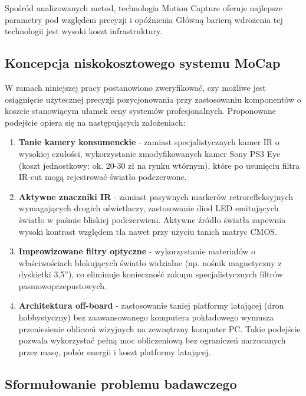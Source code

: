 \documentclass{EE-dyplom}
\begin{document}
Spośród analizowanych metod, technologia Motion Capture oferuje najlepsze parametry pod względem precyzji i opóźnienia 
Główną barierą wdrożenia tej technologii jest wysoki koszt infrastruktury. 




\subsection{Koncepcja niskokosztowego systemu MoCap}

W ramach niniejszej pracy postanowiono zweryfikować, czy możliwe jest osiągnięcie użytecznej precyzji pozycjonowania przy zastosowaniu komponentów o koszcie stanowiącym ułamek ceny systemów profesjonalnych. Proponowane podejście opiera się na następujących założeniach:

\begin{enumerate}
    \item \textbf{Tanie kamery konsumenckie} - zamiast specjalistycznych kamer IR o wysokiej czułości, wykorzystanie zmodyfikowanych kamer Sony PS3 Eye (koszt jednostkowy: ok. 20-30 zł na rynku wtórnym), które po usunięciu filtra IR-cut mogą rejestrować światło podczerwone.
    
    \item \textbf{Aktywne znaczniki IR} - zamiast pasywnych markerów retrorefleksyjnych wymagających drogich oświetlaczy, zastosowanie diod LED emitujących światło w paśmie bliskiej podczerwieni. Aktywne źródło światła zapewnia wysoki kontrast względem tła nawet przy użyciu tanich matryc CMOS.
    
    \item \textbf{Improwizowane filtry optyczne} - wykorzystanie materiałów o właściwościach blokujących światło widzialne (np. nośnik magnetyczny z dyskietki 3,5''), co eliminuje konieczność zakupu specjalistycznych filtrów pasmowoprzepustowych.
    
    \item \textbf{Architektura off-board} - zastosowanie taniej platformy latającej (dron hobbystyczny) bez zaawansowanego komputera pokładowego wymusza przeniesienie obliczeń wizyjnych na zewnętrzny komputer PC. Takie podejście pozwala wykorzystać pełną moc obliczeniową bez ograniczeń narzucanych przez masę, pobór energii i koszt platformy latającej.
\end{enumerate}

\subsection{Sformułowanie problemu badawczego}
\end{document}
